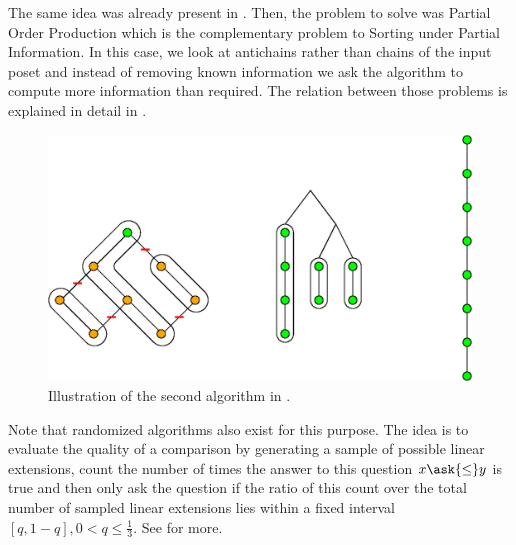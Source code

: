 The same idea was already present in \citet*{cardinal:2010}. Then, the problem
to solve was Partial Order Production which is the complementary problem to
Sorting under Partial Information. In this case, we look at antichains rather
than chains of the input poset and instead of removing known information we ask
the algorithm to compute more information than required. The relation between
those problems is explained in detail in \cite{DBLP:conf/birthday/CardinalF13}.

\begin{figure}
	\centering
	\includegraphics[height=0.2\textheight]{fig/supi/reduction:diag}
	\caption{\label{fig:supi/alg2} Illustration of the second algorithm in
\citet*{cardinal:2013}.}
\end{figure}


Note that randomized algorithms also exist for this purpose. The idea is to
evaluate the quality of a comparison by generating a sample of possible linear
extensions, count the number of times the answer to this question \(x
\ask{\le} y\) is true and then only ask the question if the ratio of
this count over the total number of sampled linear extensions lies within a
fixed interval $[q, 1-q], 0 < q \le \frac{1}{3}$. See \citet*{huber2006fast} for
more.

